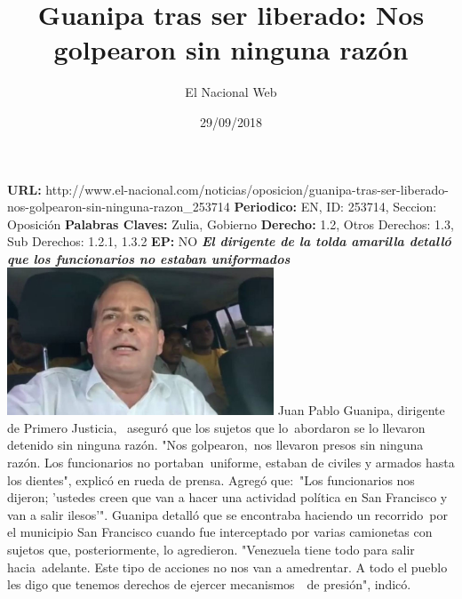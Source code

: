 \documentclass{article}%
\title{\textbf{Guanipa tras ser liberado: Nos golpearon sin ninguna razón}}%
\author{El Nacional Web}%
\date{29/09/2018}%
\begin{document}
%
\normalsize%
\maketitle%
\textbf{URL: }%
http://www.el{-}nacional.com/noticias/oposicion/guanipa{-}tras{-}ser{-}liberado{-}nos{-}golpearon{-}sin{-}ninguna{-}razon\_253714\newline%
%
\textbf{Periodico: }%
EN, %
ID: %
253714, %
Seccion: %
Oposición\newline%
%
\textbf{Palabras Claves: }%
Zulia, Gobierno\newline%
%
\textbf{Derecho: }%
1.2, %
Otros Derechos: %
1.3, %
Sub Derechos: %
1.2.1, 1.3.2\newline%
%
\textbf{EP: }%
NO\newline%
\newline%
%
\textbf{\textit{El dirigente de la tolda amarilla detalló que los funcionarios no estaban uniformados~}}%
\newline%
\newline%
%
\includegraphics[width=300px]{45.jpg}%
\newline%
%
Juan Pablo Guanipa, dirigente de Primero Justicia,~ aseguró que los sujetos que lo~abordaron se lo llevaron detenido sin ninguna razón.%
\newline%
%
"Nos golpearon,~nos llevaron presos sin ninguna razón. Los funcionarios no portaban~uniforme, estaban de civiles y armados hasta los dientes", explicó en rueda de prensa.%
\newline%
%
Agregó que:~"Los funcionarios nos dijeron; 'ustedes creen que van a hacer una actividad política en San Francisco y van a salir ilesos'".%
\newline%
%
Guanipa detalló que se encontraba haciendo un recorrido~por el municipio San Francisco cuando fue interceptado por varias camionetas con sujetos que, posteriormente, lo agredieron.%
\newline%
%
"Venezuela tiene todo para salir hacia~adelante. Este tipo de acciones no nos van a amedrentar. A todo el pueblo les digo que tenemos derechos de ejercer mecanismos~~de presión", indicó.%
\newline%
%
\end{document}
